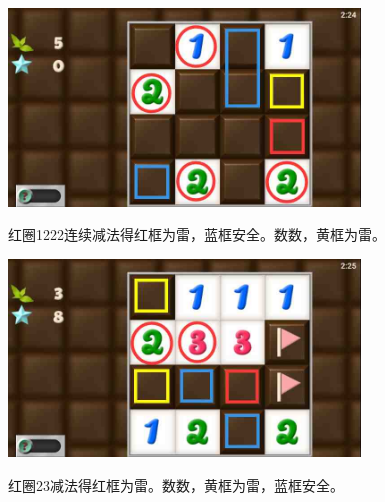 \subsection{} %
\begin{center}
    \includegraphics[width=0.7\textwidth]{puzzlelow/146-1.jpg}
\end{center}
红圈1222连续减法得红框为雷，蓝框安全。数数，黄框为雷。
\begin{center}
    \includegraphics[width=0.7\textwidth]{puzzlelow/146-2.jpg}
\end{center}
红圈23减法得红框为雷。数数，黄框为雷，蓝框安全。

